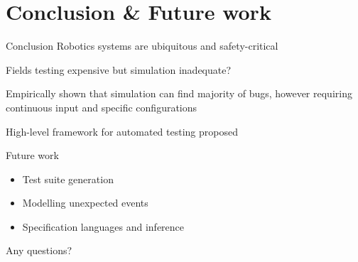 \section{Conclusion \& Future work}
	\begin{frame}{Conclusion}
		Robotics systems are ubiquitous and safety-critical

		Fields testing expensive but simulation inadequate?

		\pause
		Empirically shown that simulation can find majority of bugs, however requiring continuous input and specific configurations

		\pause
		High-level framework for automated testing proposed
	\end{frame}

	\begin{frame}{Future work}
		\begin{itemize}
			\item Test suite generation
			\item Modelling unexpected events
			\item Specification languages and inference
		\end{itemize}
	\end{frame}

\begin{frame}[standout]

	{\Large Any questions?}

\end{frame}





